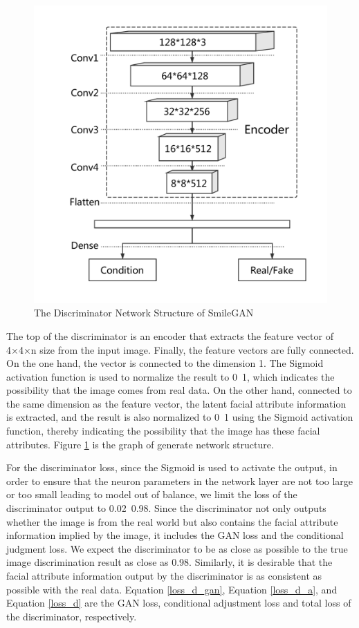 \begin{figure}
\begin{minipage}[t]{0.48\linewidth}
        \includegraphics[width=\textwidth]{figures/net_discriminator.pdf}
        \caption{The Discriminator Network Structure of SmileGAN}
        \label{net_discriminator}
    \end{minipage}
\end{figure}

The top of the discriminator is an encoder that extracts the feature vector of 4×4×n size from the input image.
Finally, the feature vectors are fully connected.
On the one hand, the vector is connected to the dimension 1.
The Sigmoid activation function is used to normalize the result to 0~1,
    which indicates the possibility that the image comes from real data.
On the other hand, connected to the same dimension as the feature vector,
    the latent facial attribute information is extracted,
    and the result is also normalized to 0~1 using the Sigmoid activation function,
    thereby indicating the possibility that the image has these facial attributes.
Figure \ref{net_discriminator} is the graph of generate network structure.


For the discriminator loss, since the Sigmoid is used to activate the output,
    in order to ensure that the neuron parameters in the network layer are not too large or too small leading to model out of balance,
    we limit the loss of the discriminator output to 0.02~0.98.
Since the discriminator not only outputs whether the image is from the real world but also contains the facial attribute information implied by the image,
    it includes the GAN loss and the conditional judgment loss.
We expect the discriminator to be as close as possible to the true image discrimination result as close as 0.98.
Similarly, it is desirable that the facial attribute information output by the discriminator is as consistent as possible with the real data.
Equation \eqref{loss_d_gan}, Equation \eqref{loss_d_a}, and Equation \eqref{loss_d} are the GAN loss, conditional adjustment loss and total loss of the discriminator, respectively.



